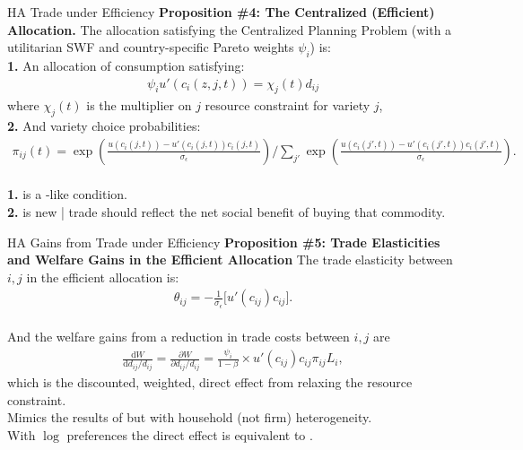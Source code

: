 \documentclass[9pt,pdftex,aspectratio=1610]{beamer}
\theoremstyle{definition}
\begin{document}
\begin{frame}[t]{HA Trade under Efficiency}
\smallskip
\textbf{Proposition \#4: The Centralized (Efficient) Allocation.} The allocation satisfying the Centralized Planning Problem (with a utilitarian SWF and country-specific Pareto weights $\psi_i$) is:\\
\bigskip
\textbf{1.} An allocation of consumption satisfying:
\begin{align}
\psi_{i} u'(c_{i}(z,j,t) ) = \chi_{j}(t) d_{ij} \nonumber
\end{align}
where $\chi_{j}(t)$ is the multiplier on $j$ resource constraint for variety $j$,\\
\bigskip
\medskip
\textbf{2.} And variety choice probabilities:
\begin{align}
\displaystyle \pi_{ij}(t) =\exp \left( \frac{u(c_{i}(j,t)) - u'(c_{i}(j,t))c_{i}(j,t)}{\sigma_{\epsilon}}\right) \bigg / \sum_{j'}\exp \left( \frac{u(c_{i}(j',t)) - u'(c_{i}(j',t))c_{i}(j',t)}{\sigma_{\epsilon}} \right). \nonumber
\end{align}\\
\bigskip
\medskip
\textbf{1.} is a \citet{backus1993}-like condition. \\
\smallskip
\textbf{2.} is new | trade should reflect the net social benefit of buying that commodity.
\end{frame}

\begin{frame}[t]{HA Gains from Trade under Efficiency}
\smallskip
\textbf{Proposition \#5: Trade Elasticities and Welfare Gains in the Efficient Allocation} The trade elasticity between $i,j$ in the efficient allocation is:
\begin{align}
\theta_{ij} =  -\frac{1}{\sigma_{\epsilon}} \bigg [ u'(c_{ij}) c_{ij} \bigg]. \nonumber
\end{align}\\
\bigskip
And the welfare gains from a reduction in trade costs between $i,j$ are
\begin{align}
\frac{\mathrm{d} W}{\mathrm{d} d_{ij} / d_{ij}} = \frac{\partial W}{\partial d_{ij} / d_{ij}} = \frac{\psi_{i}}{1-\beta} \times u'(c_{ij}) c_{ij} \pi_{ij} L_i, \nonumber
\end{align}
which is the discounted, weighted, direct effect from relaxing the resource constraint.\\
\bigskip
\medskip
Mimics the results of \citet{AtkesonBurstein2010} but with household (not firm) heterogeneity.\\
\medskip
With $\log$ preferences the direct effect is equivalent to \citet{arkolakis2012new}.\\
\bigskip

\end{frame}
\end{document}

